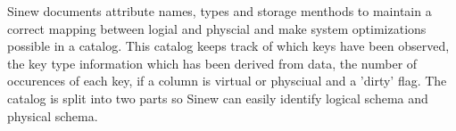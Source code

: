 \documentclass[sigconf]{acmart}
\begin{document}
    Sinew documents attribute names, types and storage menthods to maintain a correct mapping between logial and physcial and make system optimizations possible in a catalog. This catalog keeps track of which keys have been observed, the key type information which has been derived from data, the number of occurences of each key, if a column is virtual or physciual and a 'dirty' flag. The catalog is split into two parts so Sinew can easily identify logical schema and physical schema. 

    
    



\end{document}
